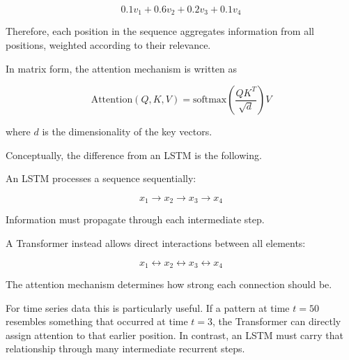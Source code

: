 \documentclass[a4paper]{article}
\begin{document}
    \[
    0.1 v_1 + 0.6 v_2 + 0.2 v_3 + 0.1 v_4
    \]
    
    Therefore, each position in the sequence aggregates information from all positions, weighted according to their relevance.
    
    In matrix form, the attention mechanism is written as
    
    \[
    \text{Attention}(Q,K,V) =
    \text{softmax}\!\left(\frac{QK^T}{\sqrt{d}}\right)V
    \]
    
    where \(d\) is the dimensionality of the key vectors.
    
    Conceptually, the difference from an LSTM is the following.
    
    An LSTM processes a sequence sequentially:
    
    \[
    x_1 \rightarrow x_2 \rightarrow x_3 \rightarrow x_4
    \]
    
    Information must propagate through each intermediate step.
    
    A Transformer instead allows direct interactions between all elements:
    
    \[
    x_1 \leftrightarrow x_2 \leftrightarrow x_3 \leftrightarrow x_4
    \]
    
    The attention mechanism determines how strong each connection should be.
    
    For time series data this is particularly useful. If a pattern at time \(t=50\) resembles something that occurred at time \(t=3\), the Transformer can directly assign attention to that earlier position. In contrast, an LSTM must carry that relationship through many intermediate recurrent steps.

\end{document}
